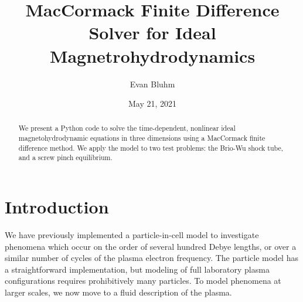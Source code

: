 \documentclass[%
 reprint,
 amsmath,amssymb,
 aps,
]{revtex4-2}
\begin{document}

\title{MacCormack Finite Difference Solver for Ideal Magnetrohydrodynamics}%

\author{Evan Bluhm}


\date{May 21, 2021}%
\begin{abstract}

We present a Python code to solve the time-dependent, nonlinear ideal magnetohydrodynamic equations in three dimensions using a MacCormack finite difference method. We apply the model to two test problems: the Brio-Wu shock tube, and a screw pinch equilibrium.

\end{abstract}

\maketitle



\section{Introduction}

We have previously implemented a particle-in-cell model to investigate phenomena which occur on the order of several hundred Debye lengths, or over a similar number of cycles of the plasma electron frequency. The particle model has a straightforward implementation, but modeling of full laboratory plasma configurations requires prohibitively many particles. To model phenomena at larger scales, we now move to a fluid description of the plasma.
\end{document}
